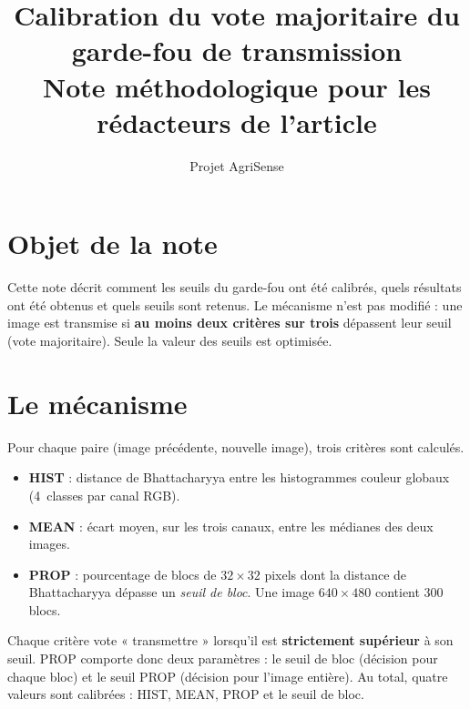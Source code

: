 \documentclass[11pt,a4paper]{article}
\title{Calibration du vote majoritaire du garde-fou de transmission\\
	\large Note méthodologique pour les rédacteurs de l'article}
\author{Projet AgriSense}
\date{}
\begin{document}
	\maketitle
	
	\section{Objet de la note}
	Cette note décrit comment les seuils du garde-fou ont été calibrés, quels résultats ont été obtenus et
	quels seuils sont retenus. Le mécanisme n'est pas modifié : une image est transmise si \textbf{au moins
		deux critères sur trois} dépassent leur seuil (vote majoritaire). Seule la valeur des seuils est optimisée.
	
	\section{Le mécanisme}
	Pour chaque paire (image précédente, nouvelle image), trois critères sont calculés.
	\begin{itemize}[nosep]
		\item \textbf{HIST} : distance de Bhattacharyya entre les histogrammes couleur globaux (4~classes par canal RGB).
		\item \textbf{MEAN} : écart moyen, sur les trois canaux, entre les médianes des deux images.
		\item \textbf{PROP} : pourcentage de blocs de $32\times32$ pixels dont la distance de Bhattacharyya
		dépasse un \emph{seuil de bloc}. Une image $640\times480$ contient 300 blocs.
	\end{itemize}
	Chaque critère vote « transmettre » lorsqu'il est \textbf{strictement supérieur} à son seuil. PROP comporte
	donc deux paramètres : le seuil de bloc (décision pour chaque bloc) et le seuil PROP (décision pour l'image
	entière). Au total, quatre valeurs sont calibrées : HIST, MEAN, PROP et le seuil de bloc.
	
\end{document}

